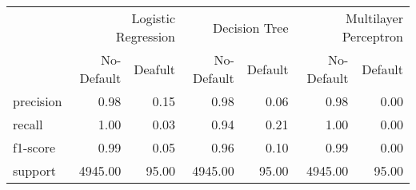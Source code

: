 \begin{table}
\thcenter
\begin{tabular}{lrrrrrr}
 & \multicolumn{2}{r}{Logistic Regression} & \multicolumn{2}{r}{Decision Tree  } & \multicolumn{2}{r}{Multilayer Perceptron} \\
 & No-Default & Deafult & No-Default & Default & No-Default & Default \\
precision & 0.98 & 0.15 & 0.98 & 0.06 & 0.98 & 0.00 \\
recall & 1.00 & 0.03 & 0.94 & 0.21 & 1.00 & 0.00 \\
f1-score & 0.99 & 0.05 & 0.96 & 0.10 & 0.99 & 0.00 \\
support & 4945.00 & 95.00 & 4945.00 & 95.00 & 4945.00 & 95.00 \\
\end{tabular}
\end{table}
